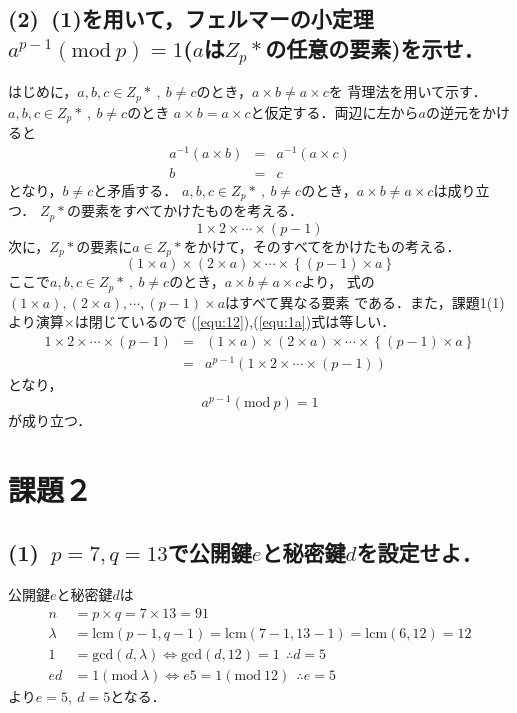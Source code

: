 \documentclass[a4paper,12pt]{jarticle}
\begin{document}
\subsection*{(2)~(1)を用いて，フェルマーの小定理$a^{p-1}(\mathrm{mod}~p)=1$($a$は$Z_p*$の任意の要素)を示せ．}
はじめに，$a,b,c\in Z_p*~,~b\neq c$のとき，$a \times b \neq a \times c$を
背理法を用いて示す．$a,b,c\in Z_p*~,~b\neq c$のとき
$a \times b = a\times c$と仮定する．両辺に左から$a$の逆元をかけると
%
\begin{eqnarray}
 a^{-1}(a \times b) &=& a^{-1} (a \times c) \\
 b &=& c
\end{eqnarray}
%
となり，$b\neq c$と矛盾する．
$a,b,c\in Z_p*~,~b\neq c$のとき，$a \times b \neq a \times c$は成り立つ．
$Z_p*$の要素をすべてかけたものを考える．
%
\begin{equation} \label{equ:12}
 1 \times 2 \times \cdots \times (p-1) 
\end{equation}
%
次に，$Z_p*$の要素に$a\in Z_p*$をかけて，そのすべてをかけたもの考える．
%
\begin{equation} \label{equ:1a}
 (1 \times a)\times (2 \times a)
  \times \cdots \times \left\{ (p-1) \times a\right\}
\end{equation}
%
ここで$a,b,c\in Z_p*~,~b\neq c$のとき，$a \times b \neq a \times c$より，
式の$(1 \times a),(2 \times a),\cdots,(p-1) \times a$はすべて異なる要素
である．また，課題1(1)より演算$\times$は閉じているので
(\ref{equ:12}),(\ref{equ:1a})式は等しい．
%
\begin{eqnarray}
 1 \times 2 \times \cdots \times (p-1) &=& (1 \times a)\times (2 \times a)
  \times \cdots \times \left\{ (p-1) \times a\right\} \\
&=&a^{p-1}(1 \times 2 \times \cdots \times (p-1))
\end{eqnarray}
%
となり，
%
\begin{equation}
 a^{p-1} (\mathrm{mod}~p)=1
\end{equation}
%
が成り立つ．
\vspace{-20mm}
\section*{課題２}
\vspace{-3mm}
\subsection*{(1)~$p=7,q=13$で公開鍵$e$と秘密鍵$d$を設定せよ．}
公開鍵$e$と秘密鍵$d$は
%
\begin{align*}
  n&=p \times q = 7 \times 13 = 91 \\
 \lambda &= \mathrm{lcm}(p-1,q-1) = \mathrm{lcm}(7-1,13-1) =\mathrm{lcm}(6,12)=12 \\
 1&=\mathrm{gcd}(d,\lambda) \iff \mathrm{gcd}(d,12)=1 ~~\therefore d=5\\
 ed &= 1(\mathrm{mod}~\lambda) \iff e5=1(\mathrm{mod}~12) ~~\therefore e=5
\end{align*}
%
より$e=5,~d=5$となる．
\vspace{-5mm}
\end{document}
